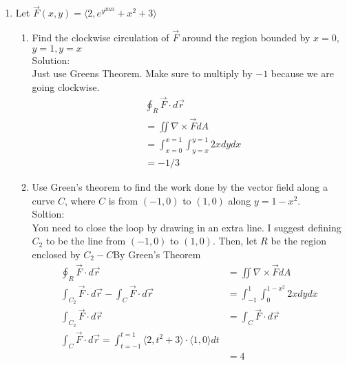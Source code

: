 \documentclass[11pt]{article}
\begin{document}
\begin{enumerate}
\begin{enumerate}
        \end{enumerate}
        \item Let $\vec{F}(x,y) = \langle 2, e^{y^{2023}} +x^{2}+3 \rangle$
        \begin{enumerate}
          \item Find the clockwise circulation of $\vec{F}$ around the region bounded
                by $x=0$, $y=1, y=x$ \\
                Solution: \\
                Just use Greens Theorem. Make sure to multiply by $-1$ because we
                are going clockwise.
                \begin{align*}
                  &\oint_{R} \vec{F} \cdot d\vec{r} \\
                  &= \iint \nabla \times \vec{F} dA \\
                  &= \int_{x=0}^{x=1}\int_{y=x}^{y=1} 2x dy dx \\
                  &= -1/3
                  \end{align*}
                \item Use Green’s theorem to find the work done by the vector field along a curve $C$, where $C$ is from $(-1, 0)$ to $(1, 0)$ along $y=1-x^{2}$.
                \\
                Soltion: \\
                You need to close the loop by drawing in an extra line. I suggest defining $C_{2}$ to be the line from $(-1, 0)$
                to $(1, 0)$. Then, let $R$ be the region enclosed by $C_{2}-C$By Green's Theorem
                \begin{align*}
                  \oint_{R} \vec{F} \cdot d\vec{r} &= \iint \nabla \times \vec{F} dA \\
                  \int_{C_{2}} \vec{F} \cdot d\vec{r} - \int_{C} \vec{F} \cdot d\vec{r} &= \int_{-1}^{1} \int_{0}^{1-x^{2}} 2x dy dx \\
                  \int_{C_{2}} \vec{F} \cdot d\vec{r} &= \int_{C} \vec{F} \cdot d\vec{r} \\
                  \int_{C} \vec{F} \cdot d\vec{r} = \int_{t=-1}^{t=1} \langle 2, t^{2} + 3 \rangle \cdot \langle 1 , 0 \rangle dt\\
                  &=4
                \end{align*}
                \end{enumerate}
\end{enumerate}
\end{document}

